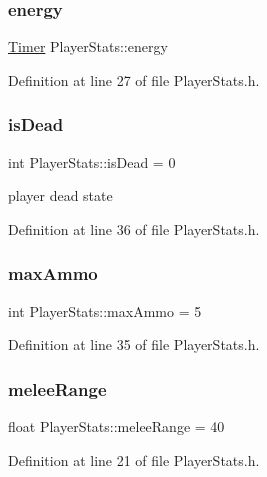 \subsubsection{\texorpdfstring{energy}{energy}}
{\footnotesize\ttfamily \hyperlink{struct_timer}{Timer} Player\+Stats\+::energy}



Definition at line 27 of file Player\+Stats.\+h.

\mbox{\label{struct_player_stats_a8a20827747238fa6322e7d79a4f46f51}} 
\subsubsection{\texorpdfstring{is\+Dead}{isDead}}
{\footnotesize\ttfamily int Player\+Stats\+::is\+Dead = 0}

player dead state 

Definition at line 36 of file Player\+Stats.\+h.

\mbox{\label{struct_player_stats_afbfb80a6992ad7a4627e62ce89b20a10}} 
\subsubsection{\texorpdfstring{max\+Ammo}{maxAmmo}}
{\footnotesize\ttfamily int Player\+Stats\+::max\+Ammo = 5}



Definition at line 35 of file Player\+Stats.\+h.

\mbox{\label{struct_player_stats_a4f410ca507dc427d07216c4d9f5c72b4}} 
\subsubsection{\texorpdfstring{melee\+Range}{meleeRange}}
{\footnotesize\ttfamily float Player\+Stats\+::melee\+Range = 40}



Definition at line 21 of file Player\+Stats.\+h.


